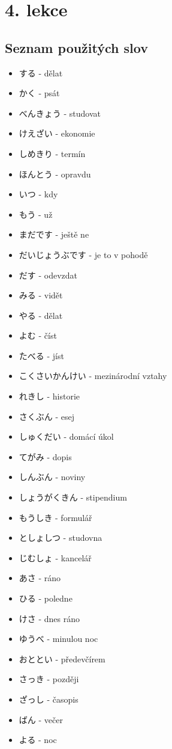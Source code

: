 \section{4. lekce}

\subsection*{Seznam použitých slov}

\begin{itemize}
    \item する - dělat
    \item かく - psát
    \item べんきょう - studovat
    \item けえざい - ekonomie
    \item しめきり - termín
    \item ほんとう - opravdu
    \item いつ - kdy
    \item もう - už
    \item まだです - ještě ne
    \item だいじょうぶです - je to v pohodě
    \item だす - odevzdat
    \item みる - vidět
    \item やる - dělat
    \item よむ - číst
    \item たべる - jíst
    \item こくさいかんけい - mezinárodní vztahy
    \item れきし - historie
    \item さくぶん - esej
    \item しゅくだい - domácí úkol
    \item てがみ - dopis
    \item しんぶん - noviny
    \item しょうがくきん - stipendium
    \item もうしき - formulář
    \item としょしつ - studovna
    \item じむしょ - kancelář
    \item あさ - ráno
    \item ひる - poledne
    \item けさ - dnes ráno
    \item ゆうべ - minulou noc
    \item おととい - předevčírem
    \item さっき - později
    \item ざっし - časopis
    \item ばん - večer
    \item よる - noc
\end{itemize}

